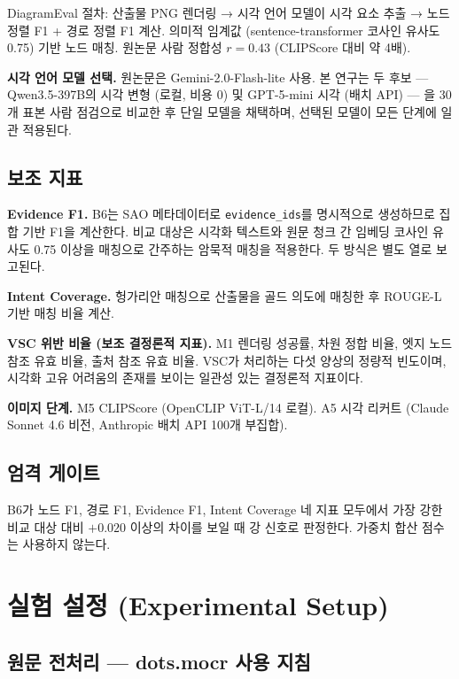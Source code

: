 \documentclass[11pt]{article}
\begin{document}
DiagramEval 절차: 산출물 PNG 렌더링 → 시각 언어 모델이 시각 요소 추출 → 노드 정렬 F1 + 경로 정렬 F1 계산. 의미적 임계값 (sentence-transformer 코사인 유사도 0.75) 기반 노드 매칭. 원논문 사람 정합성 $r=0.43$ (CLIPScore 대비 약 4배).

\textbf{시각 언어 모델 선택.} 원논문은 Gemini-2.0-Flash-lite 사용. 본 연구는 두 후보 — Qwen3.5-397B의 시각 변형 (로컬, 비용 0) 및 GPT-5-mini 시각 (배치 API) — 을 30개 표본 사람 점검으로 비교한 후 단일 모델을 채택하며, 선택된 모델이 모든 단계에 일관 적용된다.

\subsection{보조 지표}

\textbf{Evidence F1.} B6는 SAO 메타데이터로 \texttt{evidence\_ids}를 명시적으로 생성하므로 집합 기반 F1을 계산한다. 비교 대상은 시각화 텍스트와 원문 청크 간 임베딩 코사인 유사도 0.75 이상을 매칭으로 간주하는 암묵적 매칭을 적용한다. 두 방식은 별도 열로 보고된다.

\textbf{Intent Coverage.} 헝가리안 매칭으로 산출물을 골드 의도에 매칭한 후 ROUGE-L 기반 매칭 비율 계산.

\textbf{VSC 위반 비율 (보조 결정론적 지표).} M1 렌더링 성공률, 차원 정합 비율, 엣지 노드 참조 유효 비율, 출처 참조 유효 비율. VSC가 처리하는 다섯 양상의 정량적 빈도이며, 시각화 고유 어려움의 존재를 보이는 일관성 있는 결정론적 지표이다.

\textbf{이미지 단계.} M5 CLIPScore (OpenCLIP ViT-L/14 로컬). A5 시각 리커트 (Claude Sonnet 4.6 비전, Anthropic 배치 API 100개 부집합).

\subsection{엄격 게이트}

B6가 노드 F1, 경로 F1, Evidence F1, Intent Coverage 네 지표 모두에서 가장 강한 비교 대상 대비 $+0.020$ 이상의 차이를 보일 때 강 신호로 판정한다. 가중치 합산 점수는 사용하지 않는다.

\section{실험 설정 (Experimental Setup)}

\subsection{원문 전처리 — dots.mocr 사용 지침}
\label{sec:dotsmocr-guide}
\end{document}
